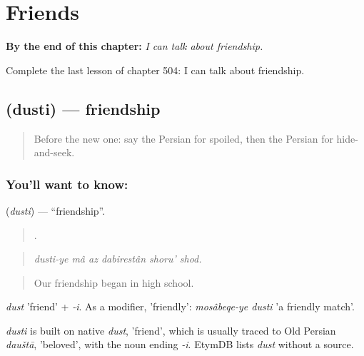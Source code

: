 
\chapter{Friends}
\label{ch:fa-friends}

\begin{chapteropening}
\textbf{By the end of this chapter:} \emph{I can talk about friendship.}

Complete the last lesson of chapter 504: I can talk about friendship.
\end{chapteropening}

\section[\texorpdfstring{\fa{دوستی} (dusti)}{دوستی (dusti)}]{ (dusti) — friendship}

\label{lesson:FA-C504-dusti}



\begin{quote}
Before the new one: say the Persian for spoiled, then the Persian for hide-and-seek.
\end{quote}

\subsection*{You'll want to know: }
\textbf{} (\emph{dusti}) — \textquotedblleft{}friendship\textquotedblright{}.

\begin{quote}
     .
\end{quote}

\begin{quote}
\emph{dusti-ye mâ az dabirestân shoru' shod.}
\end{quote}

\begin{quote}
Our friendship began in high school.
\end{quote}

\emph{dust} 'friend' + \emph{-i}. As a modifier, 'friendly': \emph{mosâbeqe-ye dusti} 'a friendly match'.

\begin{cousinweb}
\emph{dusti} is built on native \emph{dust}, 'friend', which is usually traced to Old Persian \emph{dauštā}, 'beloved', with the noun ending \emph{-i}. EtymDB lists \emph{dust} without a source.
\end{cousinweb}

